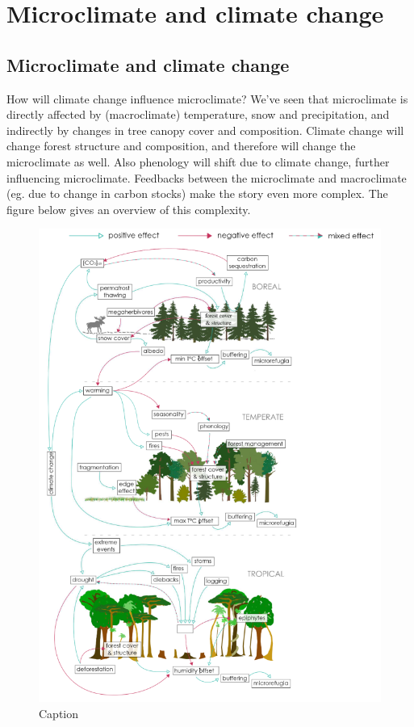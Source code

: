 \documentclass[12pt,oneside]{book}
\begin{document}
\section{Microclimate and climate
change}\label{microclimate-and-climate-change}

\subsection{Microclimate and climate
change}\label{microclimate-and-climate-change-1}

How will climate change influence microclimate? We've seen that
microclimate is directly affected by (macroclimate) temperature, snow
and precipitation, and indirectly by changes in tree canopy cover and
composition. Climate change will change forest structure and
composition, and therefore will change the microclimate as well. Also
phenology will shift due to climate change, further influencing
microclimate. Feedbacks between the microclimate and macroclimate (eg.
due to change in carbon stocks) make the story even more complex. The
figure below gives an overview of this complexity.

\begin{figure}

{\centering \includegraphics[width=0.8\linewidth]{figures/Figure1040} 

}

\caption{Caption}\label{fig:Micro40}
\end{figure}
\end{document}
